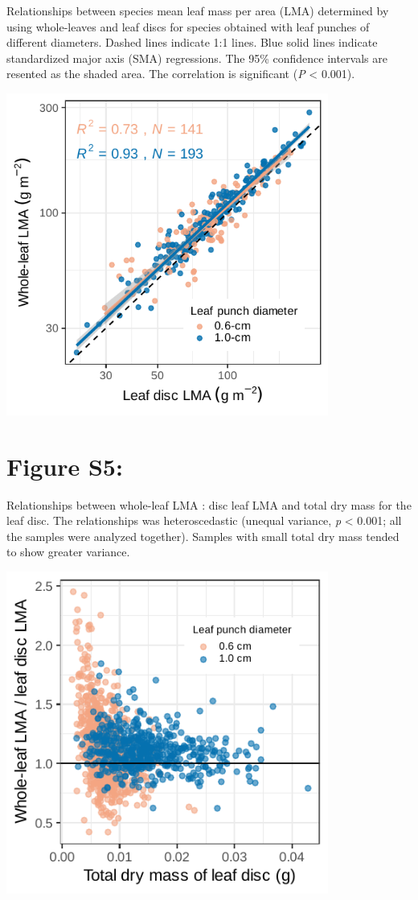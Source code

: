 \documentclass[
  12pt,
  a4paper,
,tablecaptionabove
]{scrartcl}
\begin{document}
Relationships between species mean leaf mass per area (LMA) determined
by using whole-leaves and leaf discs for species obtained with leaf
punches of different diameters. Dashed lines indicate 1:1 lines. Blue
solid lines indicate standardized major axis (SMA) regressions. The 95\%
confidence intervals are resented as the shaded area. The correlation is
significant (\emph{P} \textless{} 0.001).

\includegraphics[width=4.16667in,height=\textheight]{../figs/sma_sep.pdf}

\newpage

\hypertarget{figure-s5}{%
\section{Figure S5:}\label{figure-s5}}

Relationships between whole-leaf LMA : disc leaf LMA and total dry mass
for the leaf disc. The relationships was heteroscedastic (unequal
variance, \emph{p} \textless{} 0.001; all the samples were analyzed
together). Samples with small total dry mass tended to show greater
variance.

\includegraphics[width=4.16667in,height=\textheight]{../figs/ratio_dm.pdf}
\end{document}
